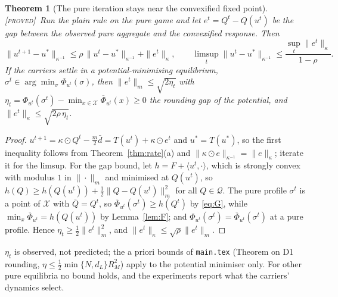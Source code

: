 \documentclass[11pt]{article}
\newtheorem{theorem}{Theorem}
\theoremstyle{definition}
\theoremstyle{remark}
\newcommand{\cQ}{\mathcal{Q}}
\newcommand{\cX}{\mathcal{X}}
\newcommand{\ip}[2]{\langle #1,#2\rangle}
\newcommand{\Qbar}{\bar Q}
\newcommand{\dbar}{\bar d}
\newcommand{\Phibar}{\overline{\Phi}}
\newcommand{\norm}[2]{\|#1\|_{#2}}
\newcommand{\PROVED}{{\normalfont\textsc{[proved]}}}
\begin{document}
\begin{theorem}[The pure iteration stays near the convexified fixed point]\label{thm:neigh}\PROVED\
Run the plain rule on the pure game and let $e^t=Q^t-Q(u^t)$ be the gap between the observed pure aggregate and the convexified response. Then
\[\norm{u^{t+1}-u^*}{\kappa^{-1}}\le\rho\,\norm{u^t-u^*}{\kappa^{-1}}+\norm{e^t}{\kappa},\qquad\limsup_t\norm{u^t-u^*}{\kappa^{-1}}\le\frac{\sup_t\norm{e^t}{\kappa}}{1-\rho}.\]
If the carriers settle in a potential-minimising equilibrium, $\sigma^t\in\arg\min_\sigma\Phi_{u^t}(\sigma)$, then $\norm{e^t}{m}\le\sqrt{2\eta_t}$ with $\eta_t=\Phi_{u^t}(\sigma^t)-\min_{x\in\cX}\Phibar_{u^t}(x)\ge0$ the rounding gap of the potential, and $\norm{e^t}\kappa\le\sqrt{2\rho\,\eta_t}$.
\end{theorem}
\begin{proof}
$u^{t+1}=\kappa\odot Q^t-\tfrac m2\dbar=T(u^t)+\kappa\odot e^t$ and $u^*=T(u^*)$, so the first inequality follows from Theorem~\ref{thm:rate}(a) and $\norm{\kappa\odot e}{\kappa^{-1}}=\norm e\kappa$; iterate it for the limsup. For the gap bound, let $h=F+\ip{u^t}{\cdot}$, which is strongly convex with modulus $1$ in $\norm\cdot m$ and minimised at $Q(u^t)$, so $h(Q)\ge h(Q(u^t))+\tfrac12\norm{Q-Q(u^t)}{m}^2$ for all $Q\in\cQ$. The pure profile $\sigma^t$ is a point of $\cX$ with $\Qbar=Q^t$, so $\Phibar_{u^t}(\sigma^t)\ge h(Q^t)$ by \eqref{eq:G}, while $\min_x\Phibar_{u^t}=h(Q(u^t))$ by Lemma~\ref{lem:F}; and $\Phi_{u^t}(\sigma^t)=\Phibar_{u^t}(\sigma^t)$ at a pure profile. Hence $\eta_t\ge\tfrac12\norm{e^t}{m}^2$, and $\norm{e^t}\kappa\le\sqrt\rho\norm{e^t}m$.
\end{proof}

$\eta_t$ is observed, not predicted; the a priori bounds of \texttt{main.tex} (Theorem on D1 rounding, $\eta\le\tfrac12\min\{N,d_L\}R_M^2$) apply to the potential minimiser only. For other pure equilibria no bound holds, and the experiments report what the carriers' dynamics select.
\end{document}
